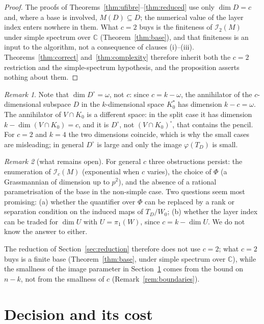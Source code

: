 \documentclass[journal]{IEEEtran}
\theoremstyle{plainn}
\theoremstyle{remark}
\newtheorem{remark}{Remark}
\begin{document}
\begin{proof}
The proofs of Theorems~\ref{thm:ufibre}--\ref{thm:reduced} use only $\dim D=c$ and, where a base is
involved, $M(D)\subseteq D$; the numerical value of the layer index enters nowhere in them. What $c=2$
buys is the finiteness of $\mathcal I_2(M)$ under simple spectrum over $\mathbb C$
(Theorem~\ref{thm:base}), and that finiteness is an input to the algorithm, not a consequence of
clauses (i)--(iii). Theorems~\ref{thm:correct} and~\ref{thm:complexity} therefore inherit both the $c=2$
restriction and the simple-spectrum hypothesis, and the proposition asserts nothing about them.
\end{proof}

\begin{remark}\label{rem:annihilator}
Note that $\dim D^\circ=\omega$, not $c$: since $c=k-\omega$, the annihilator of the $c$-dimensional
subspace $D$ in the $k$-dimensional space $K_0^*$ has dimension $k-c=\omega$. The annihilator of
$V\cap K_0$ is a different space: in the split case it has dimension $k-\dim(V\cap K_0)=c$, and it is
$D^\circ$, not $(V\cap K_0)^\circ$, that contains the pencil. For $c=2$ and $k=4$ the two dimensions
coincide, which is why the small cases are misleading; in general $D^\circ$ is large and only the image
$\varphi(T_D)$ is small.
\end{remark}

\begin{remark}[what remains open]\label{rem:open}
For general $c$ three obstructions persist: the enumeration of $\mathcal I_c(M)$ (exponential when $c$
varies), the choice of $\Phi$ (a Grassmannian of dimension up to $p^2$), and the absence of a rational
parametrisation of the base in the non-simple case. Two questions seem most promising: (a) whether the
quantifier over $\Phi$ can be replaced by a rank or separation condition on the induced maps of
$T_D/W_0$; (b) whether the layer index can be traded for $\dim U$ with $U=\pi_1(W)$, since
$c=k-\dim U$. We do not know the answer to either.
\end{remark}

The reduction of Section~\ref{sec:reduction} therefore does not use $c=2$; what $c=2$ buys is a finite
base (Theorem~\ref{thm:base}, under simple spectrum over $\mathbb C$), while the smallness of the image
parameter in Section~\ref{sec:decision} comes from the bound on $n-k$, not from the smallness of $c$
(Remark~\ref{rem:boundaries}).

\section{Decision and its cost}\label{sec:decision}
\end{document}
